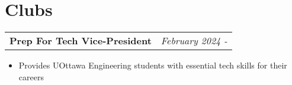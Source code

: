 \documentclass[a4paper,12pt]{article}
\begin{document}









\section{Clubs}


\begin{tabularx}{\linewidth}{ @{}X r@{} }
    {\textbf{Prep For Tech Vice-President}}  & \textit{February 2024 - } \\
\end{tabularx}
\begin{itemize}[nosep,leftmargin=*]
        \item Provides UOttawa Engineering students with essential tech skills for their careers
\end{itemize}
\vfill
\end{document}
